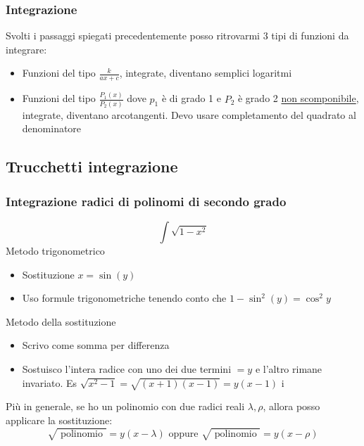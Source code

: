 \subsubsection*{Integrazione}
Svolti i passaggi spiegati precedentemente posso ritrovarmi 3 tipi di funzioni da integrare:
\begin{itemize}
	\item Funzioni del tipo $ \displaystyle \frac{k}{ax + c} $, integrate, diventano semplici logaritmi
	\item Funzioni del tipo $ \displaystyle \frac{P_1\left( x \right) }{P_2\left( x \right) } $ dove $ p_1 $ è di grado 1 e $ P_2 $ è grado 2 \underline{non scomponibile}, integrate, diventano arcotangenti. Devo usare completamento del quadrato al denominatore
\end{itemize}

\subsection{Trucchetti integrazione}
\subsubsection*{Integrazione radici di polinomi di secondo grado}
\[
	\boxed{\int \sqrt{1-x^2}}
\]
Metodo trigonometrico
\begin{itemize}
	\item Sostituzione $ x=\sin \left( y \right)  $
	\item Uso formule trigonometriche tenendo conto che $ 1-\sin ^2 \left( y \right) = \cos ^2 y $
\end{itemize}
Metodo della sostituzione
\begin{itemize}
	\item Scrivo come somma per differenza
	\item Sostuisco l'intera radice con uno dei due termini $ =y $ e l'altro rimane invariato. Es $ \sqrt{x^2 -1} =\sqrt{\left( x+1 \right) \left( x-1 \right) } = y\left( x-1 \right)  $
	      i
\end{itemize}
Più in generale, se ho un polinomio con due radici reali $ \lambda, \rho   $, allora posso applicare la sostituzione:
\[
	\sqrt{ \text{ polinomio }} = y\left( x- \lambda  \right) \text{ oppure } \sqrt{ \text{ polinomio }} =y \left( x-\rho \right)
\]

